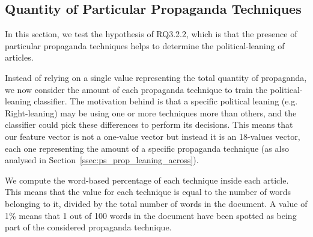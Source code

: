 



\subsection{Quantity of Particular Propaganda Techniques}
\label{ssec:ps_prop_leaning_classifier_techniques}

In this section, we test the hypothesis of RQ3.2.2, which is that the presence of particular propaganda techniques helps to determine the political-leaning of articles.

Instead of relying on a single value representing the total quantity of propaganda, we now consider the amount of each propaganda technique to train the political-leaning classifier.
The motivation behind is that a specific political leaning (e.g. Right-leaning) may be using one or more techniques more than others, and the classifier could pick these differences to perform its decisions.
This means that our feature vector is not a one-value vector but instead it is an 18-values vector, each one representing the amount of a specific propaganda technique (as also analysed in Section~\ref{ssec:ps_prop_leaning_across}).


We compute the word-based percentage of each technique inside each article. This means that the value for each technique is equal to the number of words belonging to it, divided by the total number of words in the document. A value of 1\% means that 1 out of 100 words in the document have been spotted as being part of the considered propaganda technique.

